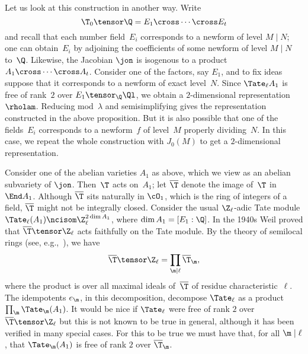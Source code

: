 \documentclass{report}
\begin{document}
Let us look at this construction in another way. Write
$$\T_0\tensor\Q=E_1\cross\cdots\cross E_t$$
and recall that each number field~$E_i$
corresponds to a newform of level
$M\mid N$; one can obtain~$E_i$
by adjoining the coefficients of
some newform of level $M\mid N$ to~$\Q$.
Likewise, the Jacobian
$\jon$ is isogenous to a product $A_1\cross\cdots\cross A_t$.
Consider
one of the factors, say $E_1$, and to fix ideas suppose
that it corresponds to a newform of exact level~$N$. Since
$\Tate_{\ell}A_1$ is free of rank~$2$ over
$E_1\tensor_{\Q}\Ql$, we obtain a $2$-dimensional
representation~$\rholam$. Reducing mod~$\lambda$ and semisimplifying gives
the representation constructed in the above proposition.
But it is also possible that one of the fields~$E_i$
corresponds to a newform~$f$ of level~$M$ properly dividing~$N$.
In this case, we repeat the whole construction with $J_0(M)$
to get a $2$-dimensional representation.

Consider one of the abelian varieties $A_1$ as above,
which we view as an abelian  subvariety of $\jon$.
Then~$\T$ acts on~$A_1$; let $\overline{\T}$
denote the image of~$\T$ in $\End A_1$.
Although $\overline{\T}$ sits naturally in
$\cO_1$, which is the ring of integers of a field,
$\overline{\T}$ might not be integrally closed. Consider
the usual $\Z_{\ell}$-adic Tate module
$\Tate_{\ell}(A_1)\ncisom\Z_{\ell}^{2\dim A_1}$, where
$\dim A_1=[E_1:\Q]$.
In the 1940s Weil proved that
$\overline{\T}\tensor \Z_{\ell}$
acts  faithfully on the Tate module.
By the theory of semilocal rings
(see, e.g.,~\cite[Cor.~7.6]{eisenbud}), we have
$$\overline{\T}\tensor\Z_{\ell}
 =\prod_{\m \mid \ell}\overline{\T}_{\m},$$
where the product is over all maximal ideals of~$\overline{\T}$ of
residue characteristic~$\ell$.
The idempotents $e_\m$, in this decomposition, decompose $\Tate_\ell$
as a product $\prod_{\m}\Tate_{\m}(A_1)$.
It would be nice if $\Tate_{\ell}$ were free of
rank $2$ over $\overline{\T}\tensor\Z_{\ell}$ but
this is not known to be true in general, although
it has been verified in many special cases. For this to be
true we must have that, for all $\m\mid \ell$, that
$\Tate_{\m}(A_1)$ is free of rank $2$ over $\overline{\T}_\m$.
\end{document}

